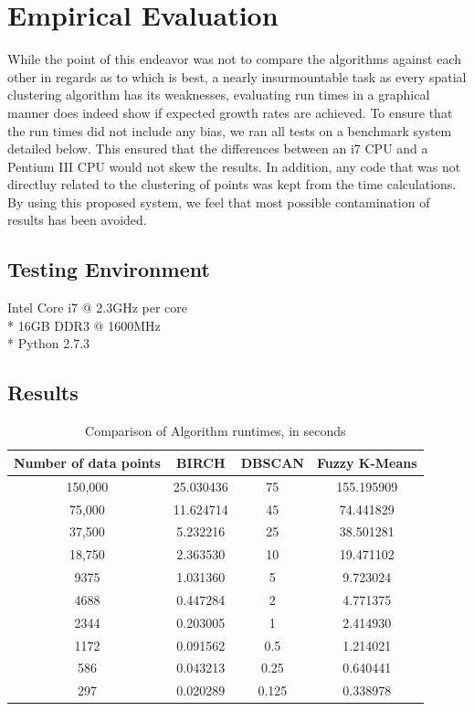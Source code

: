 \documentclass[conference, 10pt]{IEEEtran}
\begin{document}
  \section{Empirical Evaluation}
  While the point of this endeavor was not to compare the algorithms against each other in regards as to which is best, a nearly insurmountable task as every spatial clustering algorithm has its weaknesses, evaluating run times in a graphical manner does indeed show if expected growth rates are achieved. To ensure that the run times did not include any bias, we ran all tests on a benchmark system detailed below. This ensured that the differences between an i7 CPU and a Pentium III CPU would not skew the results. In addition, any code that was not directluy related to the clustering of points was kept from the time calculations. By using this proposed system, we feel that most possible contamination of results has been avoided.

  \subsection{Testing Environment}
  \begin{center}
  Intel Core i7 @ 2.3GHz per core\\*
  16GB DDR3 @ 1600MHz\\*
  Python 2.7.3
  \end{center}

  \subsection{Results}

  \begin{table}[h]
  \begin{center}
  \caption{Comparison of Algorithm runtimes, in seconds} \label{Table1Label}
  \begin{tabular}{|c|c|c|c|}
   \hline
   Number of data points & BIRCH & DBSCAN& Fuzzy K-Means \\
   \hline
   150,000 & 25.030436 & 75 & 155.195909\\
   \hline
   75,000 & 11.624714 & 45 & 74.441829\\
   \hline
   37,500 & 5.232216 & 25 & 38.501281\\
   \hline
   18,750 & 2.363530 & 10 & 19.471102\\
   \hline
   9375 & 1.031360 & 5 & 9.723024\\
   \hline
   4688 & 0.447284 & 2 & 4.771375\\
   \hline
   2344 & 0.203005 & 1 & 2.414930\\
   \hline
   1172 & 0.091562 & 0.5 & 1.214021\\
   \hline
   586 & 0.043213 & 0.25 & 0.640441\\
   \hline
   297 & 0.020289 & 0.125 & 0.338978\\
   \hline
  \end{tabular}
  \end{center}
  \end{table}
\end{document}
